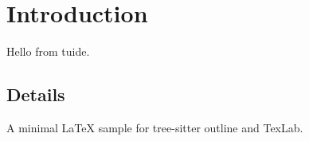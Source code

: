 \documentclass{article}
\begin{document}
\section{Introduction}
Hello from tuide.

\subsection{Details}
A minimal \LaTeX{} sample for tree-sitter outline and TexLab.

\label{sec:details}
\end{document}
